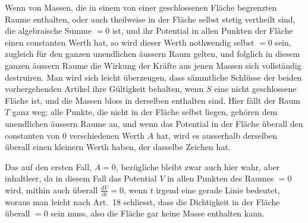 Wenn von Massen, die in einem von einer geschlossenen Fläche begrenzten Raume enthalten, oder auch theilweise in der Fläche selbst stetig vertheilt sind, die algebraische Summe $=0$ ist, und ihr Potential in allen Punkten der Fläche einen constanten Werth hat, so wird dieser Werth nothwendig selbst $=0$
sein, zugleich für den ganzen unendlichen äussern Raum gelten, und folglich in diesem ganzen äussern Raume die Wirkung der Kräfte aus jenen Massen sich vollständig destruiren.
Man wird sich leicht überzeugen, dass sämmtliche Schlüsse der beiden vorhergehenden Artikel ihre Gültigkeit behalten, wenn $S$ eine nicht geschlossene Fläche ist, und die Massen bloss in derselben enthalten sind. Hier fällt der Raum $T$ ganz weg; alle Punkte, die nicht in der Fläche selbst liegen, gehören dem unendlichen äussern Raume an, und wenn das Potential in der Fläche überall den constanten von $0$ verschiedenen Werth $A$ hat, wird es ausserhalb derselben überall einen kleinern Werth haben, der dasselbe Zeichen hat.

Das auf den ersten Fall, $A=0$, bezügliche bleibt zwar auch hier wahr, aber inhaltleer, da in diesem Fall das Potential $V$ in allen Punkten des Raumes $=0$ wird, mithin auch überall $\frac{\mathrm dV}{\mathrm dt}=0$, wenn $t$ irgend eine gerade Linie bedeutet, woraus man leicht nach Art.\ 18 schliesst, dass die Dichtigkeit in der Fläche überall $=0$ sein muss, also die Fläche gar keine Masse enthalten kann.


